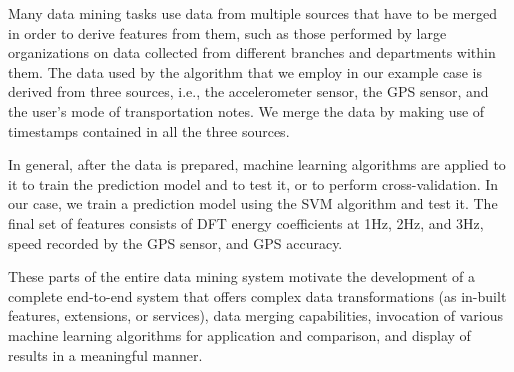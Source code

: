 Many data mining tasks use data from multiple sources that have to be merged in order to derive features from them, such as those performed by large organizations on data collected from different branches and departments within them. The data used by the algorithm that we employ in our example case is derived from three sources, i.e., the accelerometer sensor, the GPS sensor, and the user’s mode of transportation notes. We merge the data by making use of timestamps contained in all the three sources.

In general, after the data is prepared, machine learning algorithms are applied to it to train the prediction model and to test it, or to perform cross-validation. In our case, we train a prediction model using the SVM algorithm and test it. The final set of features consists of DFT energy coefficients at 1Hz, 2Hz, and 3Hz, speed recorded by the GPS sensor, and GPS accuracy.

These parts of the entire data mining system motivate the development of a complete end-to-end system that offers complex data transformations (as in-built features, extensions, or services), data merging capabilities, invocation of various machine learning algorithms for application and comparison, and display of results in a meaningful manner.